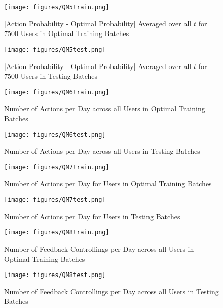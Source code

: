 	\begin{figure}[H]
	\texttt{[image: figures/QM5train.png]}%
	\caption{|Action Probability - Optimal Probability| Averaged over all $t$ for $7500$ Users in Optimal Training Batches}
	\label{QM5train}
	\end{figure}

	\begin{figure}[H]
	\texttt{[image: figures/QM5test.png]}%
	\caption{|Action Probability - Optimal Probability| Averaged over all $t$ for $7500$ Users in Testing Batches}
	\label{QM5test}
	\end{figure}

	\begin{figure}[H]
	\texttt{[image: figures/QM6train.png]}%
	\caption{Number of Actions per Day across all Users in Optimal Training Batches}
	\label{QM6train}
	\end{figure}

	\begin{figure}[H]
	\texttt{[image: figures/QM6test.png]}%
	\caption{Number of Actions per Day across all Users in Testing Batches}
	\label{QM6test}
	\end{figure}

	\begin{figure}[H]
	\texttt{[image: figures/QM7train.png]}%
	\caption{Number of Actions per Day for Users in Optimal Training Batches}
	\label{QM7train}
	\end{figure}

	\begin{figure}[H]
	\texttt{[image: figures/QM7test.png]}%
	\caption{Number of Actions per Day for Users in Testing Batches}
	\label{QM7test}
	\end{figure}

	\begin{figure}[H]
	\texttt{[image: figures/QM8train.png]}%
	\caption{Number of Feedback Controllings per Day across all Users in Optimal Training Batches}
	\label{QM8train}
	\end{figure}

	\begin{figure}[H]
	\texttt{[image: figures/QM8test.png]}%
	\caption{Number of Feedback Controllings per Day across all Users in Testing Batches}
	\label{QM8test}
	\end{figure}

